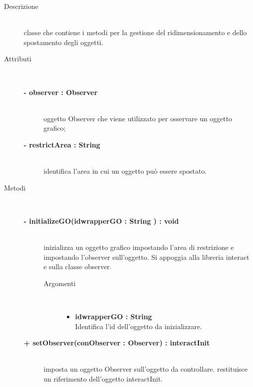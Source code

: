 \begin{description}
\item[Descrizione] \hfill \\
	classe che contiene i metodi per la gestione del ridimensionamento e dello spostamento degli oggetti. 
	
	
\item[Attributi] \hfill \\
	\begin{description}
		\item[\textbf{- observer : Observer			}] \hfill \\
			oggetto Observer che viene utilizzato per osservare un oggetto grafico;
		\item[\textbf{- 	restrictArea : String		}] \hfill \\
			identifica l'area in cui un oggetto può essere spostato.
	\end{description}
	
	
\item[Metodi] \hfill \\

	\begin{description}
		\item[\textbf{\color{blue}- initializeGO(idwrapperGO : String	) : void		}] \hfill \\
			inizializza un oggetto grafico impostando l'area di restrizione e impostando l'observer sull'oggetto. Si appoggia alla libreria interact e sulla classe observer.
			
		\begin{description}
			\item[Argomenti] \hfill \\
				\begin{itemize}
				
					\item \textbf{idwrapperGO : String			} \hfill \\
						Identifica l'id dell'oggetto da inizializzare.
					
				\end{itemize}
		\end{description}
	\end{description}		

	\begin{description}
		\item[\textbf{\color{blue}+ setObserver(conObserver : Observer) : interactInit			}] \hfill \\
			imposta un oggetto Observer sull'oggetto da controllare. restituisce un riferimento dell'oggetto interactInit.
			

\end{description}
\end{description}
